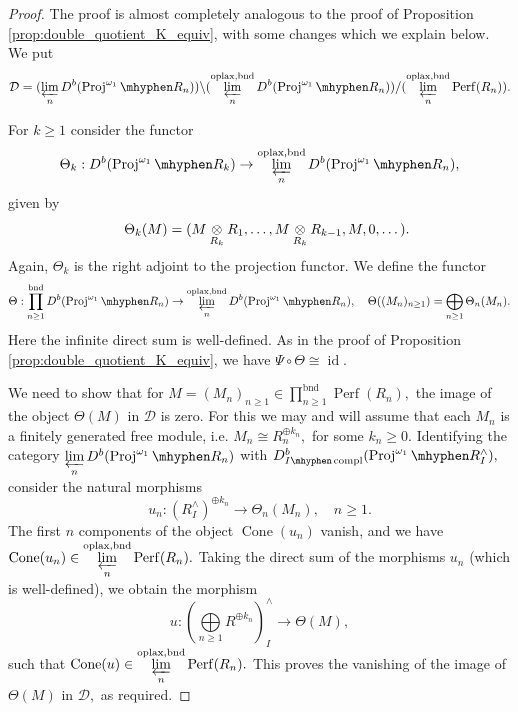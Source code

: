 \documentclass[11pt,leqno]{amsart}
\numberwithin{equation}{section}
\newcommand{\tens}[1]{%
  \mathbin{\mathop{\otimes}\displaylimits_{#1}}%
}
\newcommand{\hy}{\mhyphen}
\newcommand{\prolim}[1][]{\mathop{\varprojlim}\limits_{#1}}
\newcommand{\biggplus}[1][]{\mathop{\bigoplus}\limits_{#1}}
\newcommand{\prodd}[1][]{\mathop{\prod}\limits_{#1}}
\newcommand{\bnd}{\operatorname{bnd}}
\newcommand{\oplax}{\operatorname{oplax}}
\newcommand{\Proj}{\operatorname{Proj}}
\newcommand{\Cone}{\operatorname{Cone}}
\newcommand{\cD}{{\mathcal D}}
\newcommand{\Perf}{\operatorname{Perf}}
\newcommand{\id}{\operatorname{id}}
\newcommand{\compl}{\operatorname{compl}}
\begin{document}
\begin{proof}
The proof is almost completely analogous to the proof of Proposition \ref{prop:double_quotient_K_equiv}, with some changes which we explain below. We put
\begin{equation}\label{eq:D_for_the_double_quotient_bounded}
\cD = (\prolim[n] D^b(\Proj^{\omega_1}\hy R_n))\backslash (\prolim[n]^{\oplax,\bnd}D^b(\Proj^{\omega_1}\hy R_n))/(\prolim[n]^{\oplax,\bnd}\Perf(R_n)).
\end{equation}

For $k\geq 1$ consider the functor
\begin{equation*}
\Theta_k:D^b(\Proj^{\omega_1}\hy R_k)\to \prolim[n]^{\oplax,\bnd} D^b(\Proj^{\omega_1}\hy R_n),
\end{equation*}
given by
\begin{equation*}
\quad \Theta_k(M)=(M\tens{R_k}R_1,\dots,M\tens{R_k}R_{k-1},M,0,\dots).
\end{equation*}
Again, $\Theta_k$ is the right adjoint to the projection functor. We define the functor
\begin{equation*}
\Theta:\prodd[n\geq 1]^{\bnd}D^b(\Proj^{\omega_1}\hy R_n)\to \prolim[n]^{\oplax,\bnd} D^b(\Proj^{\omega_1}\hy R_n),\quad \Theta((M_n)_{n\geq 1})=\biggplus[n\geq 1]\Theta_n(M_n).
\end{equation*}
Here the infinite direct sum is well-defined. As in the proof of Proposition \ref{prop:double_quotient_K_equiv}, we have $\Psi\circ\Theta\cong \id.$ 

We need to show that for $M=(M_n)_{n\geq 1}\in\prodd[n\geq 1]^{\bnd}\Perf(R_n),$ the image of the object $\Theta(M)$ in $\cD$ is zero.
For this we may and will assume that each $M_n$ is a finitely generated free module, i.e. $M_n\cong R_n^{\oplus k_n},$ for some $k_n\geq 0.$ Identifying the category $\prolim[n]D^b(\Proj^{\omega_1}\hy R_n)$ with $D^b_{I\hy\compl}(\Proj^{\omega_1}\hy R^{\wedge}_I),$ consider the natural morphisms
\begin{equation*}
u_n:(R^{\wedge}_I)^{\oplus k_n}\to \Theta_n(M_n),\quad n\geq 1.
\end{equation*}
The first $n$ components of the object $\Cone(u_n)$ vanish, and we have $\Cone(u_n)\in \prolim[n]^{\oplax,\bnd}\Perf(R_n).$ Taking the direct sum of the morphisms $u_n$ (which is well-defined), we obtain the morphism
\begin{equation*}
u:(\biggplus[n\geq 1]R^{\oplus k_n})^{\wedge}_I\to \Theta(M),
\end{equation*}
such that $\Cone(u)\in  \prolim[n]^{\oplax,\bnd}\Perf(R_n).$ This proves the vanishing of the image of $\Theta(M)$ in $\cD,$ as required.


\end{proof}
\end{document}
